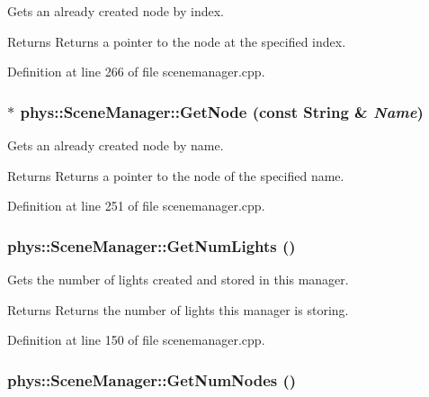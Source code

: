 Gets an already created node by index. 

\begin{DoxyReturn}{Returns}
Returns a pointer to the node at the specified index. 
\end{DoxyReturn}


Definition at line 266 of file scenemanager.cpp.

\hypertarget{classphys_1_1SceneManager_ae058104e2eebd36feb8cc84ff0e1d354}{
\subsubsection[{GetNode}]{ $\ast$ phys::SceneManager::GetNode (const {\bf String} \& {\em Name})}}
\label{dd/da8/classphys_1_1SceneManager_ae058104e2eebd36feb8cc84ff0e1d354}


Gets an already created node by name. 

\begin{DoxyReturn}{Returns}
Returns a pointer to the node of the specified name. 
\end{DoxyReturn}


Definition at line 251 of file scenemanager.cpp.

\hypertarget{classphys_1_1SceneManager_a41a5cddefca0c957fdeeb37f97cc6070}{
\subsubsection[{GetNumLights}]{ phys::SceneManager::GetNumLights ()}}
\label{dd/da8/classphys_1_1SceneManager_a41a5cddefca0c957fdeeb37f97cc6070}


Gets the number of lights created and stored in this manager. 

\begin{DoxyReturn}{Returns}
Returns the number of lights this manager is storing. 
\end{DoxyReturn}


Definition at line 150 of file scenemanager.cpp.

\hypertarget{classphys_1_1SceneManager_a9b236739b4b524a282f84b58b524efa6}{
\subsubsection[{GetNumNodes}]{ phys::SceneManager::GetNumNodes ()}}
\label{dd/da8/classphys_1_1SceneManager_a9b236739b4b524a282f84b58b524efa6}


